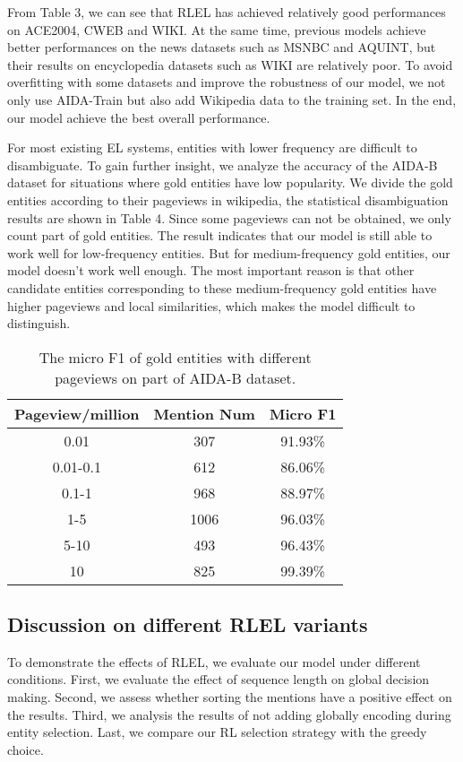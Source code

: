 \documentclass[sigconf]{acmart}
\begin{document}
From Table 3, we can see that RLEL has achieved relatively good performances on ACE2004, CWEB and WIKI. At the same time, previous models \cite{GaneaH17, TitovL18a, ChengR13} achieve better performances on the news datasets such as MSNBC and AQUINT, but their results on encyclopedia datasets such as WIKI are relatively poor. To avoid overfitting with some datasets and improve the robustness of our model, we not only use AIDA-Train but also add Wikipedia data to the training set. In the end, our model achieve the best overall performance.

For most existing EL systems, entities with lower frequency are difficult to disambiguate. To gain further insight, we analyze the accuracy of the AIDA-B dataset for situations where gold entities have low popularity. We divide the gold entities according to their pageviews in wikipedia, the statistical disambiguation results are shown in Table 4. Since some pageviews can not be obtained, we only count part of gold entities. The result indicates that our model is still able to work well for low-frequency entities. But for medium-frequency gold entities, our model doesn't work well enough. The most important reason is that other candidate entities corresponding to these medium-frequency gold entities have higher pageviews and local similarities, which makes the model difficult to distinguish.

\begin{table}
\caption{The micro F1 of gold entities with different pageviews on part of AIDA-B dataset.}
\renewcommand\arraystretch{1}
\newcommand{\tabincell}[2]{\begin{tabular}{@{}#1@{}}#2\end{tabular}}
\centering
\scalebox{1.1} {
\begin{tabular}{|c|c|c|}
\hline  
{Pageview/million} & {Mention Num} & {Micro F1} \\
\hline  
 0.01 &307 & 91.93\%  \\
\hline  
0.01-0.1  &612 &  86.06\%  \\
\hline 
0.1-1  &968 & 88.97\%  \\
\hline 
1-5 &1006 & 96.03\%  \\
\hline 
5-10  &493 & 96.43\%  \\
\hline 
 10  &825 & 99.39\%  \\
\hline 
\end{tabular}
}
\setlength{\abovecaptionskip}{8pt}
\end{table}

\subsection{Discussion on different RLEL variants}
To demonstrate the effects of RLEL, we evaluate our model under different conditions. First, we evaluate the effect of sequence length on global decision making. Second, we assess whether sorting the mentions have a positive effect on the results. Third, we analysis the results of not adding globally encoding during entity selection. Last, we compare our RL selection strategy with the greedy choice. 
\end{document}
